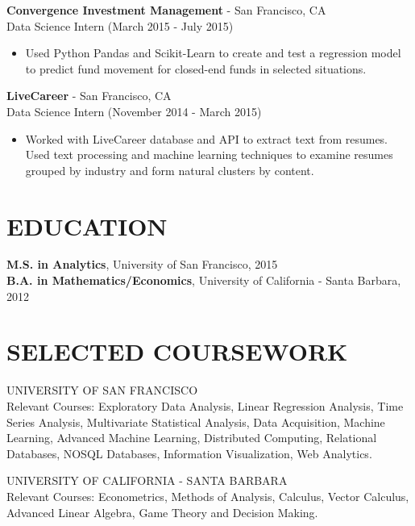 \documentclass[11pt]{res} %
\begin{document}
\begin{resume}
\textbf{Convergence Investment Management} - San Francisco, CA
\\Data Science Intern (March 2015 - July 2015)
\begin{itemize} \itemsep -4pt
\item Used Python Pandas and Scikit-Learn to create and test a regression model to predict fund movement for closed-end funds in selected situations.
\end{itemize}

\textbf{LiveCareer} - San Francisco, CA 
\\Data Science Intern (November 2014 - March 2015)
\begin{itemize} \itemsep -4pt
\item Worked with LiveCareer database and API to extract text from resumes. Used text processing and machine learning techniques to examine resumes grouped by industry and form natural clusters by content.
\end{itemize}

\section{EDUCATION} 
\textbf{M.S. in Analytics}, University of San Francisco, 2015 \\
\textbf{B.A. in Mathematics/Economics}, University of California - Santa Barbara, 2012 


\section{SELECTED COURSEWORK}

UNIVERSITY OF SAN FRANCISCO \\
\hangindent=27pt Relevant Courses: Exploratory Data Analysis, Linear Regression Analysis, Time Series Analysis, Multivariate Statistical Analysis, Data Acquisition, Machine Learning, Advanced Machine Learning, Distributed Computing, Relational Databases, NOSQL Databases, Information Visualization, Web Analytics.

UNIVERSITY OF CALIFORNIA - SANTA BARBARA\\
\hangindent=27pt Relevant Courses: Econometrics, Methods of Analysis, Calculus, Vector Calculus, Advanced Linear Algebra, Game Theory and Decision Making.




\end{resume}
\end{document}
